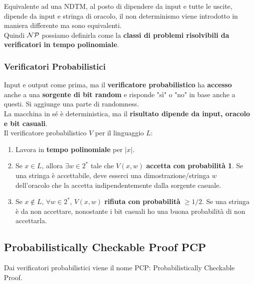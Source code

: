Equivalente ad una NDTM, al posto di dipendere da input e tutte le uscite, dipende da input e stringa di oracolo, il non determinismo viene introdotto in maniera differente ma sono equivalenti.\\

Quindi $\mathcal{NP}$ possiamo definirla come la \textbf{classi di problemi risolvibili da verificatori in tempo polinomiale}.

\newpage

\subsubsection{Verificatori Probabilistici}

Input e output come prima, ma il \textbf{verificatore probabilistico} ha \textbf{accesso} anche a una \textbf{sorgente di bit random} e risponde "sì" o "no" in base anche a questi. Si aggiunge una parte di randomness.\\

La macchina in sé è deterministica, ma il \textbf{risultato dipende da input, oracolo e bit casuali}.\\

Il verificatore probabilistico $V$ per il linguaggio $L$: 
\begin{enumerate}
	\item Lavora in \textbf{tempo polinomiale} per $|x|$.\\
	
	\item Se $x \in L$, allora $\exists w \in 2^\ast$ tale che $V(x,w)$ \textbf{accetta con probabilità 1}. Se una stringa è accettabile, deve esserci una dimostrazione/stringa $w$ dell'oracolo che la accetta indipendentemente dalla sorgente casuale.\\
	
	\item Se $x \notin L$, $\forall w \in 2^\ast$, $V(x,w)$ \textbf{rifiuta con probabilità} $\geq 1/2$. Se una stringa è da non accettare, nonostante i bit casuali ho una buona probabilità di non accettarla.\\
\end{enumerate}

\newpage

\subsection{Probabilistically Checkable Proof PCP}

Dai verificatori probabilistici viene il nome PCP: Probabilistically Checkable Proof.\\

